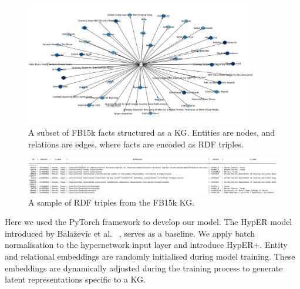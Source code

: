 \begin{figure}
   	\centering
    	\includegraphics[width=0.9\textwidth, height=0.6\textwidth]{FB15k_Graph}
	\caption{A subset of FB15k facts structured as a KG. Entities are nodes, and relations are edges, where facts are encoded as RDF triples.}
\end{figure}

\begin{figure}
   	\centering
    	\includegraphics[width=1.0\textwidth, height=0.4\textwidth]{fb15k_fact_sample}
	\caption{A sample of RDF triples from the FB15k KG.}
\end{figure}

\noindent Here we used the PyTorch framework to develop our model. The HypER model introduced by Bala\u{z}ev\'{i}c et al. \unskip ~\citep{balazevic2019hypernetwork}, serves as a baseline. We apply batch normalisation to the hypernetwork input layer and introduce HypER+. Entity and relational embeddings are randomly initialised during model training. These embeddings are dynamically adjusted during the training process to generate latent representations specific to a KG.

